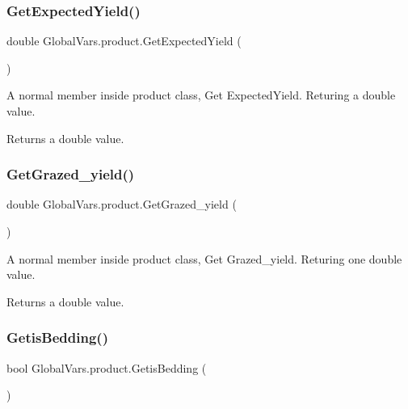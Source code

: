 \subsubsection{\texorpdfstring{GetExpectedYield()}{GetExpectedYield()}}
{\footnotesize\ttfamily double Global\+Vars.\+product.\+Get\+Expected\+Yield (\begin{DoxyParamCaption}{ }\end{DoxyParamCaption})\hspace{0.3cm}{\ttfamily [inline]}}



A normal member inside product class, Get Expected\+Yield. Returing a double value. 

\begin{DoxyReturn}{Returns}
a double value. 
\end{DoxyReturn}
\mbox{\label{class_global_vars_1_1product_affc6ccd9056f2c8d6bef17dc145e8e8a}} 
\subsubsection{\texorpdfstring{GetGrazed\_yield()}{GetGrazed\_yield()}}
{\footnotesize\ttfamily double Global\+Vars.\+product.\+Get\+Grazed\+\_\+yield (\begin{DoxyParamCaption}{ }\end{DoxyParamCaption})\hspace{0.3cm}{\ttfamily [inline]}}



A normal member inside product class, Get Grazed\+\_\+yield. Returing one double value. 

\begin{DoxyReturn}{Returns}
a double value. 
\end{DoxyReturn}
\mbox{\label{class_global_vars_1_1product_ac9b39f54bc2474e81629a98b3cb0008b}} 
\subsubsection{\texorpdfstring{GetisBedding()}{GetisBedding()}}
{\footnotesize\ttfamily bool Global\+Vars.\+product.\+Getis\+Bedding (\begin{DoxyParamCaption}{ }\end{DoxyParamCaption})\hspace{0.3cm}{\ttfamily [inline]}}



